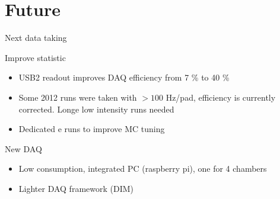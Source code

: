 \documentclass[10pt]{beamer}
\begin{document}
\section{Future}

\begin{frame}{Next data taking}
\begin{block}{Improve statistic}
\begin{itemize}
\item USB2 readout improves DAQ efficiency from 7 \% to 40 \%
\item Some 2012 runs were taken with $> 100$ Hz/pad, efficiency is currently corrected. Longe low intensity runs needed 
\item Dedicated e runs to improve MC tuning 
\end{itemize}
\end{block}
\pause
\begin{block}{ New DAQ}
\begin{itemize}
\item Low consumption, integrated PC (raspberry pi), one for 4 chambers
\item Lighter DAQ framework (DIM)
\end{itemize}

\end{block}
\end{frame}
\end{document}
